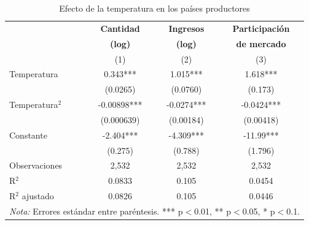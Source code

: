 \begin{table}[H]
\centering
\caption{Efecto de la temperatura en los países productores}
\label{tab:motiv}
\begin{tabular}{lccc}
\toprule
 & \textbf{Cantidad} & \textbf{Ingresos} & \textbf{Participación} \\
 & \textbf{(log)} & \textbf{(log)} & \textbf{de mercado} \\
 & (1) & (2) & (3) \\
\midrule
Temperatura & 0.343*** & 1.015*** & 1.618*** \\
 & (0.0265) & (0.0760) & (0.173) \\
Temperatura$^2$ & -0.00898*** & -0.0274*** & -0.0424*** \\
 & (0.000639) & (0.00184) & (0.00418) \\
Constante & -2.404*** & -4.309*** & -11.99*** \\
 & (0.275) & (0.788) & (1.796) \\
\midrule
Observaciones & 2,532 & 2,532 & 2,532 \\
R$^2$ & 0.0833 & 0.105 & 0.0454 \\
R$^2$ ajustado & 0.0826 & 0.105 & 0.0446 \\
\bottomrule
\multicolumn{4}{p{10cm}}{\footnotesize{\textit{Nota:} Errores estándar entre paréntesis. *** p$<$0.01, ** p$<$0.05, * p$<$0.1.}}
\end{tabular}
\end{table}